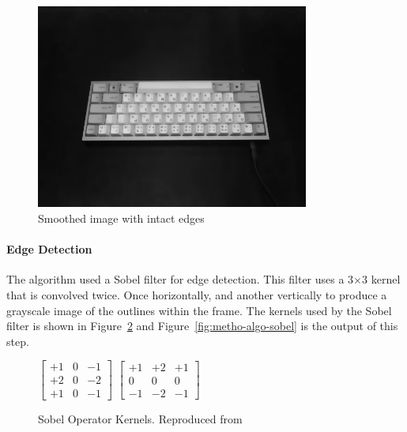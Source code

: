 \documentclass{report}
\begin{document}
\begin{figure}[H]
	\centering
	\includegraphics[width=0.8\textwidth]{denoised.png}
	\caption{Smoothed image with intact edges}
	\centering
	\label{fig:metho-algo-denoise}
\end{figure}


\paragraph{Edge Detection}
The algorithm used a Sobel filter for edge detection. This filter uses a
3$\times$3 kernel that is convolved twice. Once horizontally, and another
vertically to produce a grayscale image of the outlines within the frame. The
kernels used by the Sobel filter \parencite{sobel2014} is shown in
Figure~\ref{fig:metho-algo-key-sobel} and Figure~\ref{fig:metho-algo-sobel} is
the output of this step.

\begin{figure}[H]
	\centering
	$\begin{bmatrix}
			+1 & 0 & -1 \\
			+2 & 0 & -2 \\
			+1 & 0 & -1
		\end{bmatrix}$
	$\begin{bmatrix}
			+1 & +2 & +1 \\
			0  & 0  & 0  \\
			-1 & -2 & -1
		\end{bmatrix}$
	\caption{Sobel Operator Kernels. Reproduced from }
	\label{fig:metho-algo-key-sobel}
\end{figure}
\end{document}
